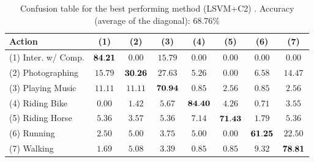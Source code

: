\documentclass{bmvc2k}
\newcommand{\green}[1]{#1} %
\newcommand{\ok}[1]{{\small \scriptsize  \color{mygreen} #1}} %
\newcommand{\bad}[1]{{\small \scriptsize  \color{red} #1}} %
\newcommand{\tfs}{\small}   %
\newcommand{\cfs}{\small}   %
\begin{document}
\begin{small}
\begin{table}[tbp]
\centering
{}
\begin{tabular}{|l|c|c|c|c|c|c|c|}
\hline
\tfs Action           & \tfs$~~$(1)$~~$ & \tfs$~~$(2)$~~$ & \tfs$~~$(3)$~~$ & \tfs$~~$(4)$~~$ & \tfs$~~$(5)$~~$ & \tfs$~~$(6)$~~$ & \tfs$~~$(7)$~~$\\ \hline 
\tfs(1) Inter. w/ Comp. & \tfs${\bf 84.21}$ & \tfs$0.00$ & \tfs$15.79$ & \tfs$0.00$ & \tfs$0.00$ & \tfs$0.00$ & \tfs$0.00$\\ \hline 
\tfs(2) Photographing   & \tfs$15.79$ & \tfs${\bf 30.26}$ & \tfs$27.63$ & \tfs$5.26$ & \tfs$0.00$ & \tfs$6.58$ & \tfs$14.47$\\ \hline 
\tfs(3) Playing Music   & \tfs$11.11$ & \tfs$11.11$ & \tfs${\bf 70.94}$ & \tfs$0.85$ & \tfs$2.56$ & \tfs$0.85$ & \tfs$2.56$\\ \hline 
\tfs(4) Riding Bike     & \tfs$0.00$ & \tfs$1.42$ & \tfs$5.67$ & \tfs${\bf 84.40}$ & \tfs$4.26$ & \tfs$0.71$ & \tfs$3.55$\\ \hline 
\tfs(5) Riding Horse    & \tfs$5.36$ & \tfs$3.57$ & \tfs$5.36$ & \tfs$7.14$ & \tfs${\bf 71.43}$ & \tfs$1.79$ & \tfs$5.36$\\ \hline 
\tfs(6) Running         & \tfs$2.50$ & \tfs$5.00$ & \tfs$3.75$ & \tfs$5.00$ & \tfs$0.00$ & \tfs${\bf 61.25}$ & \tfs$22.50$\\ \hline 
\tfs(7) Walking         & \tfs$1.69$ & \tfs$5.08$ & \tfs$3.39$ & \tfs$0.85$ & \tfs$0.85$ & \tfs$9.32$ & \tfs${\bf 78.81}$\\ \hline 

\end{tabular}
\caption{\cfs Confusion table for the best performing method \green{(LSVM+C2) \normalsize}. 
Accuracy (average of the diagonal): 68.76\%
}
\label{tab:confusion_table}
\end{table}
\end{small}


\end{document}
